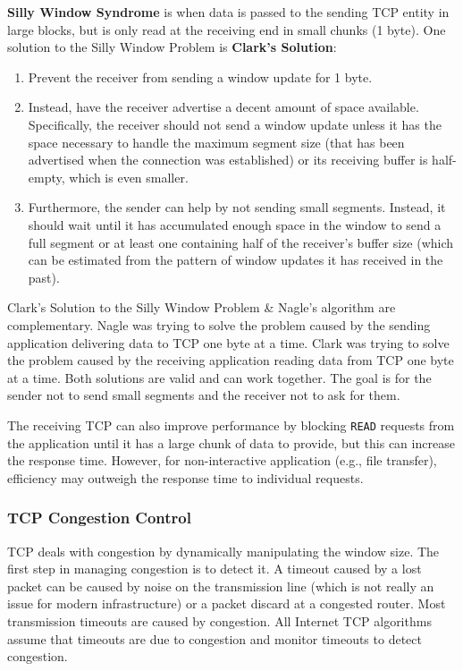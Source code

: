 \documentclass[11pt]{article}
\begin{document}
\textbf{Silly Window Syndrome} is when data is passed to the sending TCP entity in large blocks, but is only read at the receiving end in small chunks (1 byte).
One solution to the Silly Window Problem is \textbf{Clark's Solution}:
\begin{enumerate}
    \item   Prevent the receiver from sending a window update for 1 byte. 
    \item   Instead, have the receiver advertise a decent amount of space available. 
            Specifically, the receiver should not send a window update unless it has the space necessary to handle the maximum segment size (that has been advertised when the connection was established) or 
            its receiving buffer is half-empty, which is even smaller.
    \item   Furthermore, the sender can help by not sending small segments. 
            Instead, it should wait until it has accumulated enough space in the window to send a full segment or at least one containing half of the receiver's buffer size (which can be estimated from the 
            pattern of window updates it has received in the past).
\end{enumerate}

Clark's Solution to the Silly Window Problem \& Nagle's algorithm are complementary. 
Nagle was trying to solve the problem caused by the sending application delivering data to TCP one byte at a time.
Clark was trying to solve the problem caused by the receiving application reading data from TCP one byte at a time. 
Both solutions are valid and can work together.
The goal is for the sender not to send small segments and the receiver not to ask for them.

The receiving TCP can also improve performance by blocking \verb|READ| requests from the application until it has a large chunk of data to provide, but this can increase the response time.
However, for non-interactive application (e.g., file transfer), efficiency may outweigh the response time to individual requests.

\subsubsection{TCP Congestion Control}
TCP deals with congestion by dynamically manipulating the window size. 
The first step in managing congestion is to detect it. 
A timeout caused by a lost packet can be caused by noise on the transmission line (which is not really an issue for modern infrastructure) or a packet discard at a congested router. 
Most transmission timeouts are caused by congestion.
All Internet TCP algorithms assume that timeouts are due to congestion and monitor timeouts to detect congestion.
\end{document}
